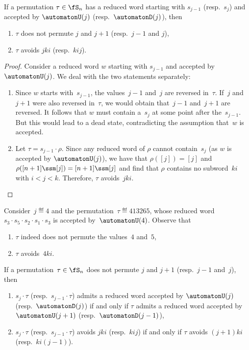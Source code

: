 \begin{lemma}\label{lem:vincent3}
If a permutation $\tau \in \fS_n$ has a reduced word starting with $s_{j-1}$ (resp.~$s_j$) and accepted by $\automatonU(j)$ (resp.~$\automatonD(j)$), then
\begin{enumerate} 
	\item $\tau$ does not permute $j$ and $j+1$ (resp.~$j-1$ and $j$),
	\item $\tau$ avoids $jki$ (resp.~$kij$).
\end{enumerate}
\end{lemma}

\pagebreak
\begin{proof}
Consider a reduced word $w$ starting with $s_{j-1}$ and accepted by~$\automatonU(j)$. 
We deal with the two statements separately:
\begin{enumerate} 
	\item Since $w$ starts with~$s_{j-1}$, the values~$j-1$ and~$j$ are reversed in~$\tau$. If~$j$ and~$j+1$ were also reversed in~$\tau$, we would obtain that~$j-1$ and~$j+1$ are reversed. It follows that $w$ must contain a~$s_j$ at some point after the~$s_{j-1}$. But this would lead to a dead state, contradicting the assumption that~$w$ is accepted.
	\item Let $\tau = s_{j-1}\cdot \rho$. Since any reduced word of $\rho$ cannot contain~$s_j$ (as $w$ is accepted by $\automatonU(j)$), we have that $\rho([j]) = [j]$ and $\rho([n+1] \ssm [j]) = [n+1] \ssm [j]$ and find that $\rho$ contains no subword~$ki$ with $i < j < k$. Therefore, $\tau$ avoids~$jki$.
	\qedhere
\end{enumerate}
\end{proof}

\begin{example}\label{exm:lemVincent3}
Consider~$j \eqdef 4$ and the permutation~$\tau \eqdef 413265$, whose reduced word~$s_3 \cdot s_5 \cdot s_2 \cdot s_1 \cdot s_3$ is accepted by~$\automatonU(4)$.
Observe that
\begin{enumerate}
	\item $\tau$ indeed does not permute the values~$4$ and~$5$,
	\item $\tau$ avoids~$4ki$.
\end{enumerate}
\end{example}

\begin{lemma}\label{lem:vincent4}
If a permutation~$\tau \in \fS_n$ does not permute $j$ and $j+1$ (resp.~$j-1$ and~$j$), then
\begin{enumerate} 
	\item $s_j \cdot \tau$ (resp.~$s_{j-1} \cdot \tau$) admits a reduced word accepted by $\automatonU(j)$ (resp.~$\automatonD(j)$) if and only if $\tau$ admits a reduced word accepted by $\automatonU(j+1)$ (resp.~$\automatonD(j-1)$),
	\item $s_j \cdot \tau$ (resp.~$s_{j-1} \cdot \tau$) avoids $jki$ (resp.~$kij$) if and only if $\tau$ avoids $(j+1)ki$ (resp.~$ki(j-1)$).
\end{enumerate}
\end{lemma}

